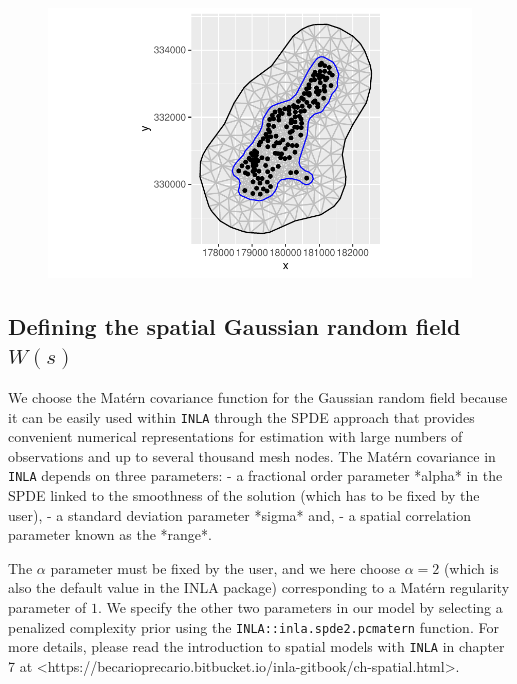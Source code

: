 \documentclass[
  a4paper,
]{article}
\begin{document}
\begin{figure}[H]

{\centering \includegraphics{pedometron_files/figure-pdf/unnamed-chunk-4-1.pdf}

}

\end{figure}

\hypertarget{defining-the-spatial-gaussian-random-field-ws}{%
\subsection{\texorpdfstring{Defining the spatial Gaussian random field
\(W(s)\)}{Defining the spatial Gaussian random field W(s)}}\label{defining-the-spatial-gaussian-random-field-ws}}

We choose the Matérn covariance function for the Gaussian random field
because it can be easily used within \texttt{INLA} through the SPDE
approach that provides convenient numerical representations for
estimation with large numbers of observations and up to several thousand
mesh nodes. The Matérn covariance in \texttt{INLA} depends on three
parameters: - a fractional order parameter *alpha* in the SPDE linked to
the smoothness of the solution (which has to be fixed by the user), - a
standard deviation parameter *sigma* and, - a spatial correlation
parameter known as the *range*.

The \(\alpha\) parameter must be fixed by the user, and we here choose
\(\alpha=2\) (which is also the default value in the INLA package)
corresponding to a Matérn regularity parameter of \(1\). We specify the
other two parameters in our model by selecting a penalized complexity
prior using the \texttt{INLA::inla.spde2.pcmatern} function. For more
details, please read the introduction to spatial models with
\texttt{INLA} in chapter 7 at
\textless https://becarioprecario.bitbucket.io/inla-gitbook/ch-spatial.html\textgreater.
\end{document}
